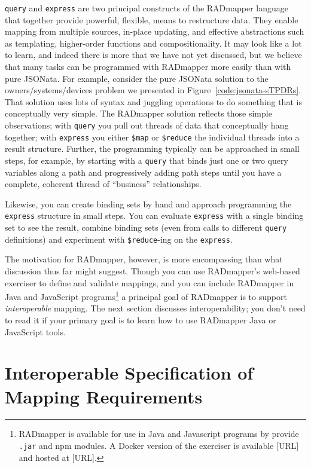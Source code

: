 \documentclass[9pt,letterpaper]{article}
\newcommand{\stt}[1]{\texttt{#1}} %
\begin{document}
\stt{query} and \stt{express} are two principal constructs of the RADmapper language that together provide powerful, flexible, means to restructure data.
They enable mapping from multiple sources, in-place updating, and effective abstractions such as templating, higher-order functions and compositionality.
It may look like a lot to learn, and indeed there is more that we have not yet discussed, but we believe that many tasks can be programmed with RADmapper more easily than with pure JSONata. 
For example, consider the pure JSONata solution to the owners/systems/devices problem we presented in Figure~\ref{code:jsonata-sTPDRs}.
That solution uses lots of syntax and juggling operations to do something that is conceptually very simple.
The RADmapper solution reflects those simple observations; with \stt{query} you pull out threads of data that conceptually hang together;
with \stt{express} you either \stt{\$map} or \stt{\$reduce} the individual threads into a result structure.
Further, the programming typically can be approached in small steps, for example, by starting with a \stt{query} that binds just one or two query variables along a path and progressively adding path steps until you have a complete, coherent thread of ``business'' relationships.

Likewise, you can create binding sets by hand and approach programming the \stt{express} structure in small steps.
You can evaluate \stt{express} with a single binding set to see the result, combine binding sets (even from calls to different \stt{query} definitions) and experiment with \stt{\$reduce}-ing on the \stt{express}.

The motivation for RADmapper, however, is more encompassing than what discussion thus far might suggest.
Though you can use RADmapper's web-based exerciser to define and validate mappings,
and you can include RADmapper in Java and JavaScript programs\footnote{RADmapper is available for use in Java and Javascript programs by provide \stt{.jar} and npm modules. A Docker version of the exerciser is available [URL] and hosted at [URL].} a principal goal of RADmapper is to support \textit{interoperable} mapping. The next section discusses interoperability; you don't need to read it if your primary goal is to learn how to use RADmapper Java or JavaScript tools.

\section{Interoperable Specification of Mapping Requirements}
\end{document}
